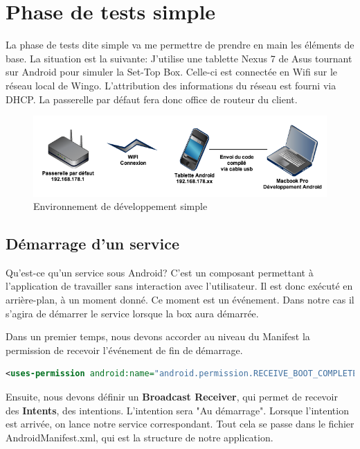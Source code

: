 
\chapter{Phase de tests simple}
La phase de tests dite simple va me permettre de prendre en main les éléments de base. La situation est la suivante: 
J'utilise une tablette Nexus 7 de Asus tournant sur Android pour simuler la Set-Top Box. Celle-ci est connectée en Wifi sur le réseau local de Wingo. L'attribution des informations du réseau est fourni via DHCP. La passerelle par défaut fera donc office de routeur du client.

\begin{figure}[H]
      \centering
      \includegraphics[width=\textwidth]{00_media/env_developpement}
      \caption{Environnement de développement simple}
      \label{gra:maqmenu}
\end{figure}

\section{Démarrage d'un service}
Qu'est-ce qu'un service sous Android? C'est un composant permettant à l'application de travailler sans interaction avec l'utilisateur. Il est donc exécuté en arrière-plan, à un moment donné. Ce moment est un événement. Dans notre cas il s'agira de démarrer le service lorsque la box aura démarrée.

\medskip

Dans un premier temps, nous devons accorder au niveau du Manifest la permission de recevoir l'événement de fin de démarrage.

\begin{lstlisting}[language=XML, caption={Permission de fin de démarrage}]
<uses-permission android:name="android.permission.RECEIVE_BOOT_COMPLETED" />
\end{lstlisting}

\medskip

Ensuite, nous devons définir un \textbf{Broadcast Receiver}, qui permet de recevoir des \textbf{Intents}, des intentions. L'intention sera "Au démarrage". Lorsque l'intention est arrivée, on lance notre service correspondant. Tout cela se passe dans le fichier AndroidManifest.xml, qui est la structure de notre application.

